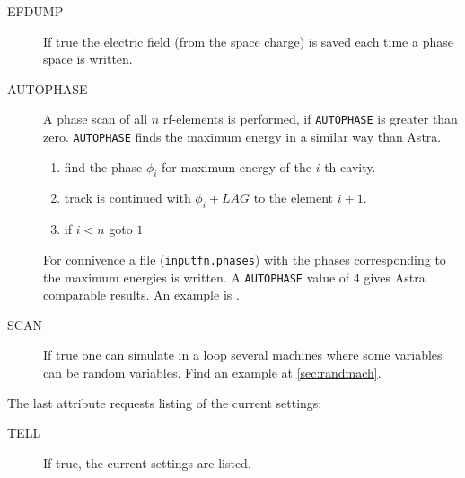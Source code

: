 \begin{description}
\item[EFDUMP]
 If true the electric field (from the space charge) is saved each time a phase space is written. 

\item[AUTOPHASE]
  A phase scan of all $n$ rf-elements is performed, if  {\tt AUTOPHASE} is greater than zero.   {\tt AUTOPHASE} finds the maximum energy in a similar way than Astra. 
 \begin{enumerate}
 \item  find the phase $\phi_i$ for maximum energy of the $i$-th cavity.
 \item  track is continued with $\phi_i + LAG$ to the element $i+1$.
 \item  if $i<n$ goto $1$
 \end{enumerate}
For connivence a file ({\tt inputfn.phases}) with the phases corresponding to the maximum energies is written. A {\tt AUTOPHASE} value of $4$ gives Astra comparable results.
An example is .


\item[SCAN]
 If true one can simulate in a loop several machines where some variables can be random variables. Find an
 example at \ref{sec:randmach}. 

\end{description}

The last attribute requests listing of the current settings:
\begin{description}
\item[TELL]
  If true, the current settings are listed.
\end{description}


